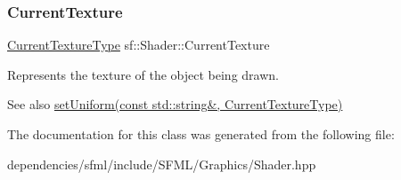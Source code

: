 \subsubsection{\texorpdfstring{Current\+Texture}{CurrentTexture}}
{\footnotesize\ttfamily \hyperlink{structsf_1_1_shader_1_1_current_texture_type}{Current\+Texture\+Type} sf\+::\+Shader\+::\+Current\+Texture\hspace{0.3cm}{\ttfamily [static]}}



Represents the texture of the object being drawn. 

\begin{DoxySeeAlso}{See also}
\hyperlink{classsf_1_1_shader_ab18f531e1f726b88fec1cf5a1e6af26d}{set\+Uniform(const std\+::string\&, Current\+Texture\+Type)} 
\end{DoxySeeAlso}


The documentation for this class was generated from the following file\+:\begin{DoxyCompactItemize}
\item 
dependencies/sfml/include/\+S\+F\+M\+L/\+Graphics/Shader.\+hpp\end{DoxyCompactItemize}
